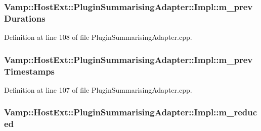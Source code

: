 \subsubsection[{\texorpdfstring{m\+\_\+prev\+Durations}{m_prevDurations}}]{ Vamp\+::\+Host\+Ext\+::\+Plugin\+Summarising\+Adapter\+::\+Impl\+::m\+\_\+prev\+Durations\hspace{0.3cm}{\ttfamily [protected]}}\hypertarget{class_vamp_1_1_host_ext_1_1_plugin_summarising_adapter_1_1_impl_aad8cd7b8ffa91818c58f26d1fd58d101}{}\label{class_vamp_1_1_host_ext_1_1_plugin_summarising_adapter_1_1_impl_aad8cd7b8ffa91818c58f26d1fd58d101}


Definition at line 108 of file Plugin\+Summarising\+Adapter.\+cpp.

\subsubsection[{\texorpdfstring{m\+\_\+prev\+Timestamps}{m_prevTimestamps}}]{ Vamp\+::\+Host\+Ext\+::\+Plugin\+Summarising\+Adapter\+::\+Impl\+::m\+\_\+prev\+Timestamps\hspace{0.3cm}{\ttfamily [protected]}}\hypertarget{class_vamp_1_1_host_ext_1_1_plugin_summarising_adapter_1_1_impl_aed10afce36913ba0b8cc2d2616f12a89}{}\label{class_vamp_1_1_host_ext_1_1_plugin_summarising_adapter_1_1_impl_aed10afce36913ba0b8cc2d2616f12a89}


Definition at line 107 of file Plugin\+Summarising\+Adapter.\+cpp.

\subsubsection[{\texorpdfstring{m\+\_\+reduced}{m_reduced}}]{ Vamp\+::\+Host\+Ext\+::\+Plugin\+Summarising\+Adapter\+::\+Impl\+::m\+\_\+reduced\hspace{0.3cm}{\ttfamily [protected]}}\hypertarget{class_vamp_1_1_host_ext_1_1_plugin_summarising_adapter_1_1_impl_af7e3175ea990a028fc730b9a2ec6272a}{}\label{class_vamp_1_1_host_ext_1_1_plugin_summarising_adapter_1_1_impl_af7e3175ea990a028fc730b9a2ec6272a}


